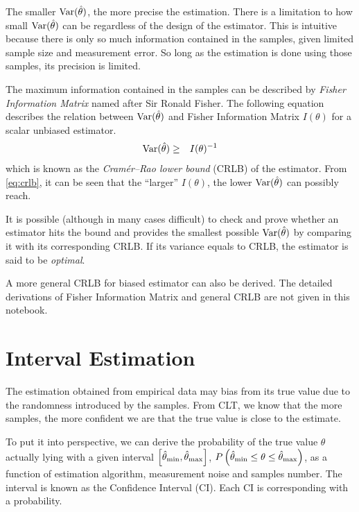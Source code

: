 The smaller $\textup{Var}(\hat{\theta})$, the more precise the estimation. There is a limitation to how small $\textup{Var}(\hat{\theta})$ can be regardless of the design of the estimator. This is intuitive because there is only so much information contained in the samples, given limited sample size and measurement error. So long as the estimation is done using those samples, its precision is limited. 

The maximum information contained in the samples can be described by \textit{Fisher Information Matrix} named after Sir Ronald Fisher. The following equation describes the relation between $\textup{Var}(\hat{\theta})$ and Fisher Information Matrix $I(\theta)$ for a scalar unbiased estimator.
\begin{eqnarray}
	\textup{Var}(\hat{\theta}) &\geq& I(\theta)^{-1} \label{eq:crlb}
\end{eqnarray}
which is known as the \textit{Cram\'{e}r–Rao lower bound} (CRLB) of the estimator. From \eqref{eq:crlb}, it can be seen that the ``larger'' $I(\theta)$, the lower $\textup{Var}(\hat{\theta})$  can possibly reach.

It is possible (although in many cases difficult) to check and prove whether an estimator hits the bound and provides the smallest possible $\textup{Var}(\hat{\theta})$ by comparing it with its corresponding CRLB. If its variance equals to CRLB, the estimator is said to be \textit{optimal}.

A more general CRLB for biased estimator can also be derived. The detailed derivations of Fisher Information Matrix and general CRLB are not given in this notebook.

\section{Interval Estimation}

The estimation obtained from empirical data may bias from its true value due to the randomness introduced by the samples. From CLT, we know that the more samples, the more confident we are that the true value is close to the estimate. 

To put it into perspective, we can derive the probability of the true value $\theta$ actually lying with a given interval $\left[\hat{\theta}_{\textup{min}},\hat{\theta}_{\textup{max}}\right]$, $P\left(\hat{\theta}_{\textup{min}} \leq \theta \leq \hat{\theta}_{\textup{max}}\right)$, as a function of estimation algorithm, measurement noise and samples number. The interval is known as the Confidence Interval (CI). Each CI is corresponding with a probability.

